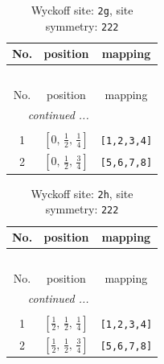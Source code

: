 \documentclass[fleqn,8pt]{jsarticle}
\begin{document}
\begin{longtable}{ccc}
\caption{Wyckoff site: {\tt 2g}, site symmetry: {\tt 222}}
 \\
 \hline \hline
No. & position & mapping \\ \hline \endfirsthead

\multicolumn{2}{l}{\tablename\ \thetable{}} \\
 \hline \hline
No. & position & mapping \\ \hline \endhead

 \hline \hline
\multicolumn{2}{r}{\footnotesize\it continued ...} \\ \endfoot

 \hline \hline
\multicolumn{2}{r}{} \\ \endlastfoot

1 & $\left[ 0,\, \frac{1}{2},\, \frac{1}{4} \right]$ & {\tt [1,2,3,4]} \\ \hline
2 & $\left[ 0,\, \frac{1}{2},\, \frac{3}{4} \right]$ & {\tt [5,6,7,8]} \\
\end{longtable}
\renewcommand{\arraystretch}{1.2}
\begin{longtable}{ccc}
\caption{Wyckoff site: {\tt 2h}, site symmetry: {\tt 222}}
 \\
 \hline \hline
No. & position & mapping \\ \hline \endfirsthead

\multicolumn{2}{l}{\tablename\ \thetable{}} \\
 \hline \hline
No. & position & mapping \\ \hline \endhead

 \hline \hline
\multicolumn{2}{r}{\footnotesize\it continued ...} \\ \endfoot

 \hline \hline
\multicolumn{2}{r}{} \\ \endlastfoot

1 & $\left[ \frac{1}{2},\, \frac{1}{2},\, \frac{1}{4} \right]$ & {\tt [1,2,3,4]} \\ \hline
2 & $\left[ \frac{1}{2},\, \frac{1}{2},\, \frac{3}{4} \right]$ & {\tt [5,6,7,8]} \\
\end{longtable}
\renewcommand{\arraystretch}{1.2}
\end{document}
